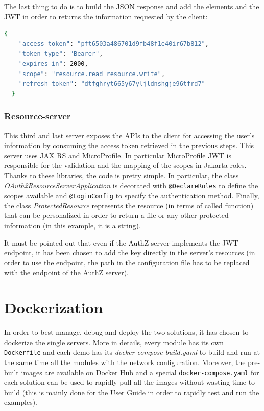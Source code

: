 The last thing to do is to build the JSON response and add the elements and the JWT in order to returns the information requested by the client:


\begin{lstlisting}[language=bash, basicstyle=\fontsize{12}{14}\ttfamily]
  {
    "access_token": "pft6503a486701d9fb48f1e40ir67b812",
    "token_type": "Bearer",  
    "expires_in": 2000,
    "scope": "resource.read resource.write",
    "refresh_token": "dtfghryt665y67yljldnshgje96tfrd7"
  }
\end{lstlisting}

\subsubsection{Resource-server}
This third and last server exposes the APIs to the client for accessing the user's information by consuming the access token retrieved in the previous steps. This server uses JAX RS and MicroProfile. In particular MicroProfile JWT is responsible for the validation and the mapping of the scopes in Jakarta roles. Thanks to these libraries, the code is pretty simple. In particular, the class \textit{OAuth2ResourceServerApplication} is decorated with \texttt{@DeclareRoles} to define the scopes available and \texttt{@LoginConfig} to specify the authentication method. Finally, the class \textit{ProtectedResource} represents the resource (in terms of called function) that can be personalized in order to return a file or any other protected information (in this example, it is a string).

It must be pointed out that even if the AuthZ server implements the JWT endpoint, it has been chosen to add the key directly in the server's resources (in order to use the endpoint, the path in the configuration file has to be replaced with the endpoint of the AuthZ server).

\section{Dockerization}
In order to best manage, debug and deploy the two solutions, it has chosen to dockerize the single servers. More in details, every module has its own \texttt{Dockerfile} and each demo has its \textit{docker-compose-build.yaml} to build and run at the same time all the modules with the network configuration. Moreover, the pre-built images are available on Docker Hub and a special \texttt{docker-compose.yaml} for each solution can be used to rapidly pull all the images without wasting time to build (this is mainly done for the User Guide in order to rapidly test and run the examples).

